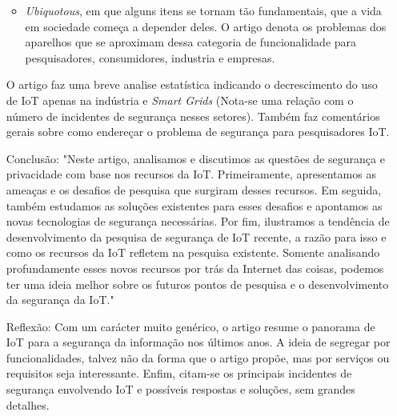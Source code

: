 \documentclass[letterpaper,11pt]{texMemo} %
\begin{document}
\begin{itemize}
\begin{itemize}
		\item \textit{Ubiquotous}, em que alguns itens se tornam tão fundamentais, que a vida em sociedade começa a depender deles. O artigo denota os problemas dos aparelhos que se aproximam dessa categoria de funcionalidade para pesquisadores, consumidores, industria e empresas.
	\end{itemize}
	O artigo faz uma breve analise estatística indicando o decrescimento do uso de IoT apenas na indústria e \textit{Smart Grids} (Nota-se uma relação com o número de incidentes de segurança nesses setores). Também faz comentários gerais sobre como endereçar o problema de segurança para pesquisadores IoT.
	\item[Conclusão:] "Neste artigo, analisamos e discutimos as questões de segurança e privacidade com base nos recursos da IoT. Primeiramente, apresentamos as ameaças e os desafios de pesquisa que surgiram desses recursos. Em seguida, também estudamos as soluções existentes para esses desafios e apontamos as novas tecnologias de segurança necessárias. Por fim, ilustramos a tendência de desenvolvimento da pesquisa de segurança de IoT recente, a razão para isso e como os recursos da IoT refletem na pesquisa existente. Somente analisando profundamente esses novos recursos por trás da Internet das coisas, podemos ter uma ideia melhor sobre os futuros pontos de pesquisa e o desenvolvimento da segurança da IoT."
	\item[Reflexão:] Com um carácter muito genérico, o artigo resume o panorama de IoT para a segurança da informação nos últimos anos. A ideia de segregar por funcionalidades, talvez não da forma que o artigo propõe, mas por serviços ou requisitos seja interessante. Enfim, citam-se os principais incidentes de segurança envolvendo IoT e possíveis respostas e soluções, sem grandes detalhes.
\end{itemize}

\end{document}
